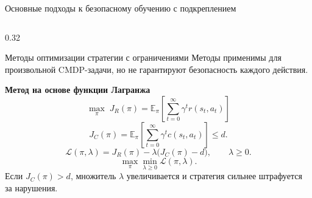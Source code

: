 \begin{frame}
    \centering
    \vfill
    \setlength{\fboxsep}{1.0em}
    \vfill
\end{frame}

{%
%
\begin{frame}[shrink=12]{Основные подходы к безопасному обучению с подкреплением}
    \footnotesize
    \setlength{\abovedisplayskip}{0.3em}
    \setlength{\belowdisplayskip}{0.3em}
    \begin{columns}[T,onlytextwidth]
        \begin{column}{0.32\textwidth}
            \begin{block}{Методы оптимизации стратегии с ограничениями}
                \scriptsize
                Методы применимы для произвольной CMDP-задачи, но не
                гарантируют безопасность каждого действия.

                \textbf{Метод на основе функции Лагранжа}
                \[
                    \max_{\pi}\;
                    J_R(\pi)=
                    \mathbb{E}_{\pi}\!\left[
                    \sum_{t=0}^{\infty}\gamma^t r(s_t,a_t)\right]
                \]
                \[
                    J_C(\pi)=
                    \mathbb{E}_{\pi}\!\left[
                    \sum_{t=0}^{\infty}\gamma^t c(s_t,a_t)\right]\le d .
                \]
                \[
                    \mathcal{L}(\pi,\lambda)
                    =
                    J_R(\pi)-\lambda\bigl(J_C(\pi)-d\bigr),
                    \qquad \lambda\geq 0 .
                \]
                \[
                    \max_{\pi}\min_{\lambda\geq 0}\mathcal{L}(\pi,\lambda).
                \]
                Если \(J_C(\pi)>d\), множитель \(\lambda\) увеличивается
                и стратегия сильнее штрафуется за нарушения.
            \end{block}
        \end{column}


\end{columns}
\end{frame}}
